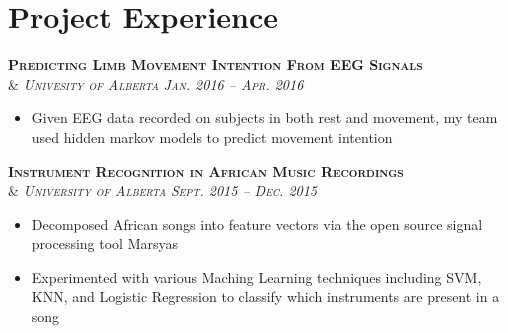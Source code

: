 \documentclass[10pt]{article} %
\begin{document}
\begin{minipage}[t]{0.43\textwidth}

\section{Project Experience} 


{\raggedright\textsc{\textbf{Predicting Limb Movement Intention From EEG Signals} 
\\& \textit{Univesity of Alberta \hfill Jan. 2016 -- Apr. 2016\\ 
}}}
\begin{itemize}
\item Given EEG data recorded on subjects in both rest and movement, my team used hidden markov models to predict movement intention
\end{itemize}


{\raggedright\textsc{\textbf{Instrument Recognition in African Music Recordings} \\
& \textit{University of Alberta \hfill Sept. 2015 -- Dec. 2015\\
}}}
\begin{itemize}
\item Decomposed African songs into feature vectors via the open source signal processing tool Marsyas
\item Experimented with various Maching Learning techniques including SVM, KNN, and Logistic Regression to classify which instruments are present in a song
\end{itemize}





\end{minipage}
\end{document}
